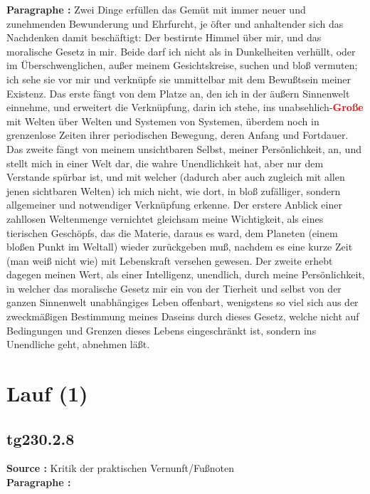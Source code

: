 \documentclass[a4paper,12pt,twoside]{book}
\newcommand{\match}[1]{\textcolor{red}{\textbf{#1}}}
\newcommand{\unnumberedsection}[1]{
	\section*{#1}
	\addcontentsline{toc}{section}{#1}
	\markright{#1}
}
\begin{document}
	\textbf{Paragraphe : }Zwei Dinge erfüllen das Gemüt mit immer neuer und zunehmenden Bewunderung und Ehrfurcht, je öfter und anhaltender sich das Nachdenken damit beschäftigt: Der bestirnte Himmel über mir, und das moralische Gesetz in mir. Beide darf ich nicht als in Dunkelheiten verhüllt, oder im Überschwenglichen, außer meinem Gesichtskreise, suchen und bloß vermuten; ich sehe sie vor mir und verknüpfe sie unmittelbar mit dem Bewußtsein meiner Existenz. Das erste fängt von dem Platze an, den ich in der äußern Sinnenwelt einnehme, und erweitert die Verknüpfung, darin ich stehe, ins unabsehlich-\match{Große} mit Welten über Welten und Systemen von Systemen, überdem noch in grenzenlose Zeiten ihrer periodischen Bewegung, deren Anfang und Fortdauer. Das zweite fängt von meinem unsichtbaren Selbst, meiner Persönlichkeit, an, und stellt mich in einer Welt dar, die wahre Unendlichkeit hat, aber nur dem Verstande spürbar ist, und mit welcher (dadurch aber auch zugleich mit allen jenen sichtbaren Welten) ich mich nicht, wie dort, in bloß zufälliger, sondern allgemeiner und notwendiger Verknüpfung erkenne. Der erstere Anblick einer zahllosen Weltenmenge vernichtet gleichsam meine Wichtigkeit, als eines tierischen Geschöpfs, das die Materie, daraus es ward, dem Planeten (einem bloßen Punkt im Weltall) wieder zurückgeben muß, nachdem es eine kurze Zeit (man weiß nicht wie) mit Lebenskraft versehen gewesen. Der zweite erhebt dagegen meinen Wert, als einer Intelligenz, unendlich, durch meine Persönlichkeit, in welcher das moralische Gesetz mir ein von der Tierheit und selbst von der ganzen Sinnenwelt unabhängiges Leben offenbart, wenigstens so viel sich aus der zweckmäßigen Bestimmung meines Daseins durch dieses Gesetz, welche nicht auf Bedingungen und Grenzen dieses Lebens eingeschränkt ist, sondern ins Unendliche geht, abnehmen läßt. 
	
	\unnumberedsection{Lauf (1)} 
	\subsection*{tg230.2.8} 
	\textbf{Source : }Kritik der praktischen Vernunft/Fußnoten\\  
	
	\textbf{Paragraphe : }
	
\end{document}
